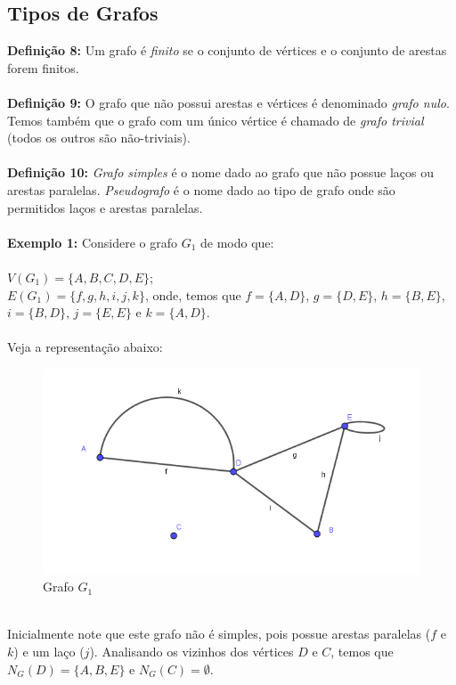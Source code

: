 \documentclass[a4paper,12pt]{article}
\begin{document}
	\subsection{Tipos de Grafos}
	\noindent\textbf{Definição 8: } Um grafo é \textit{finito} se o conjunto de vértices e o conjunto de arestas forem finitos. 
	\\
	\\
	\textbf{Definição 9: } O grafo que não possui arestas e vértices é denominado \textit{grafo nulo}. Temos também que o grafo com um único vértice é chamado de \textit{grafo trivial} (todos os outros são não-triviais).
	\\
	\\
	\textbf{Definição 10: }\textit{Grafo simples} é o nome dado ao grafo que não possue laços ou arestas paralelas. \textit{Pseudografo} é o nome dado ao tipo de grafo onde são permitidos laços e arestas paralelas.
	\\
	\\
	\textbf{Exemplo 1: }Considere o grafo $G_1$ de modo que:
	\\
	\\
	$V(G_1)=\{A, B, C, D, E\}$;
	\\
	$E(G_1)=\{f,g,h,i,j,k\}$, onde, temos que $f=\{A,D\}$, $g=\{D,E\}$, $h=\{B,E\}$, $i=\{B,D\}$, $j=\{E,E\}$ e $k=\{A,D\}$. 
	\\
	\\
	\indent Veja a representação abaixo:
	\vspace{0.5cm}
	\begin{figure}[h]
		\center
		\includegraphics[width=0.8\linewidth]{Grafo1.png}
		\caption{Grafo $G_1$}
		\label{}
	\end{figure}
	\\
	\indent Inicialmente note que este grafo não é simples, pois possue arestas paralelas ($f$ e $k$) e um laço ($j$). Analisando os vizinhos dos vértices $D$ e $C$, temos que $N_G(D)=\{A,B,E\}$ e $N_G(C)=\emptyset$.
	\\
\end{document}

